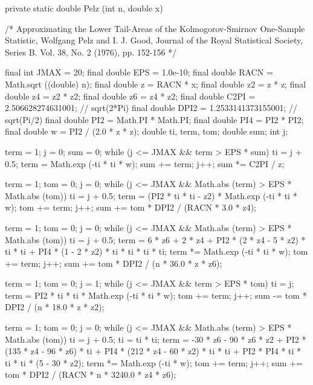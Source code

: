 \begin{code} \begin{hide}

   private static double Pelz (int n, double x) {
   /* Approximating the Lower Tail-Areas of the Kolmogorov-Smirnov One-Sample
         Statistic,
         Wolfgang Pelz and I. J. Good,
         Journal of the Royal Statistical Society, Series B.
             Vol. 38, No. 2 (1976), pp. 152-156
    */

      final int JMAX = 20;
      final double EPS = 1.0e-10;
      final double RACN = Math.sqrt ((double) n);
      final double z = RACN * x;
      final double z2 = z * z;
      final double z4 = z2 * z2;
      final double z6 = z4 * z2;
      final double C2PI = 2.506628274631001;   // sqrt(2*Pi)
      final double DPI2 = 1.2533141373155001;  // sqrt(Pi/2)
      final double PI2 = Math.PI * Math.PI;
      final double PI4 = PI2 * PI2;
      final double w = PI2 / (2.0 * z * z);
      double ti, term, tom;
      double sum;
      int j;

      term = 1;
      j = 0;
      sum = 0;
      while (j <= JMAX && term > EPS * sum) {
         ti = j + 0.5;
         term = Math.exp (-ti * ti * w);
         sum += term;
         j++;
      }
      sum *= C2PI / z;

      term = 1;
      tom = 0;
      j = 0;
      while (j <= JMAX && Math.abs (term) > EPS * Math.abs (tom)) {
         ti = j + 0.5;
         term = (PI2 * ti * ti - z2) * Math.exp (-ti * ti * w);
         tom += term;
         j++;
      }
      sum += tom * DPI2 / (RACN * 3.0 * z4);

      term = 1;
      tom = 0;
      j = 0;
      while (j <= JMAX && Math.abs (term) > EPS * Math.abs (tom)) {
         ti = j + 0.5;
         term = 6 * z6 + 2 * z4 + PI2 * (2 * z4 - 5 * z2) * ti * ti +
                PI4 * (1 - 2 * z2) * ti * ti * ti * ti;
         term *= Math.exp (-ti * ti * w);
         tom += term;
         j++;
      }
      sum += tom * DPI2 / (n * 36.0 * z * z6);

      term = 1;
      tom = 0;
      j = 1;
      while (j <= JMAX && term > EPS * tom) {
         ti = j;
         term = PI2 * ti * ti * Math.exp (-ti * ti * w);
         tom += term;
         j++;
      }
      sum -= tom * DPI2 / (n * 18.0 * z * z2);

      term = 1;
      tom = 0;
      j = 0;
      while (j <= JMAX && Math.abs (term) > EPS * Math.abs (tom)) {
         ti = j + 0.5;
         ti = ti * ti;
         term = -30 * z6 - 90 * z6 * z2 + PI2 * (135 * z4 - 96 * z6) * ti +
                PI4 * (212 * z4 - 60 * z2) * ti * ti +
                PI2 * PI4 * ti * ti * ti * (5 - 30 * z2);
         term *= Math.exp (-ti * w);
         tom += term;
         j++;
      }
      sum += tom * DPI2 / (RACN * n * 3240.0 * z4 * z6);

}
\end{hide}
\end{code}
